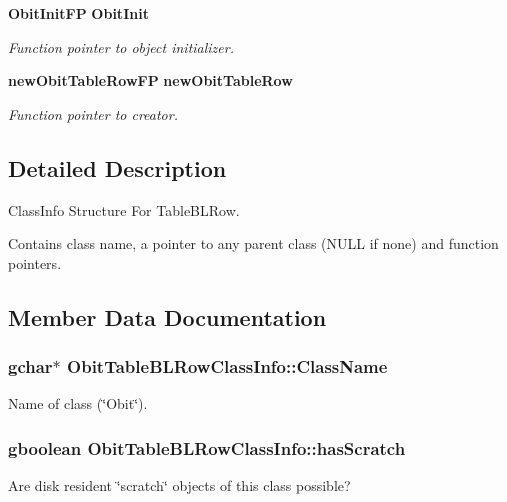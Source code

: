 \begin{CompactItemize}
{\bf Obit\-Init\-FP} {\bf Obit\-Init}
\begin{CompactList}\small\item\em Function pointer to object initializer. \item\end{CompactList}\item 
{\bf new\-Obit\-Table\-Row\-FP} {\bf new\-Obit\-Table\-Row}
\begin{CompactList}\small\item\em Function pointer to creator. \item\end{CompactList}\end{CompactItemize}


\subsection{Detailed Description}
Class\-Info Structure For Table\-BLRow. 

Contains class name, a pointer to any parent class (NULL if none) and function pointers. 



\subsection{Member Data Documentation}
\subsubsection{\setlength{\rightskip}{0pt plus 5cm}gchar$\ast$ {\bf Obit\-Table\-BLRow\-Class\-Info::Class\-Name}}\label{structObitTableBLRowClassInfo_o2}


Name of class (\char`\"{}Obit\char`\"{}). 

\subsubsection{\setlength{\rightskip}{0pt plus 5cm}gboolean {\bf Obit\-Table\-BLRow\-Class\-Info::has\-Scratch}}\label{structObitTableBLRowClassInfo_o1}


Are disk resident \char`\"{}scratch\char`\"{} objects of this class possible? 

